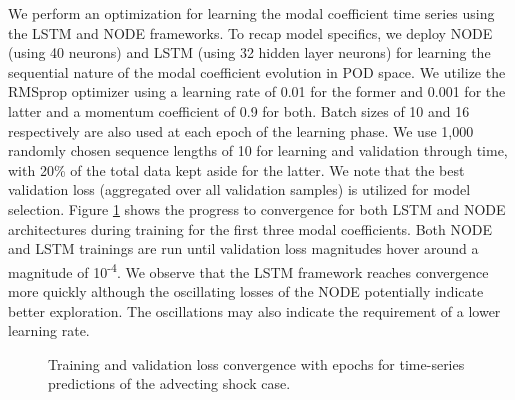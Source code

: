\documentclass[preprint,12pt]{elsarticle}
\begin{document}
We perform an optimization for 
learning the modal coefficient time series using the LSTM and NODE frameworks. 
To recap model specifics, we deploy NODE (using 40 neurons) and LSTM (using 32 hidden layer neurons) for learning the sequential nature of the modal coefficient evolution in POD space. We utilize the RMSprop optimizer using a learning rate of 0.01 for the former and 0.001 for the latter and a momentum coefficient of 0.9 for both. Batch sizes of 10 and 16 respectively are also used at each epoch of the learning phase. We use 1,000 randomly chosen sequence lengths of 10  for learning and validation through time, with 20\% of the total data kept aside for the latter. We note that the best validation loss (aggregated over all validation samples) is utilized for model selection. Figure \ref{Figure2} shows the progress to convergence for both LSTM and NODE architectures during training for the first three modal coefficients. Both NODE and LSTM trainings are run until validation loss magnitudes hover around a magnitude of 10\textsuperscript{-4}. We observe that the LSTM framework reaches convergence more quickly although the oscillating losses of the NODE potentially indicate better exploration. The oscillations may also indicate the requirement of a lower learning rate.

\begin{figure}
	\centering
	\caption{Training and validation loss convergence with epochs for time-series predictions of the advecting shock case.}
	\label{Figure2}
\end{figure}
\end{document}
